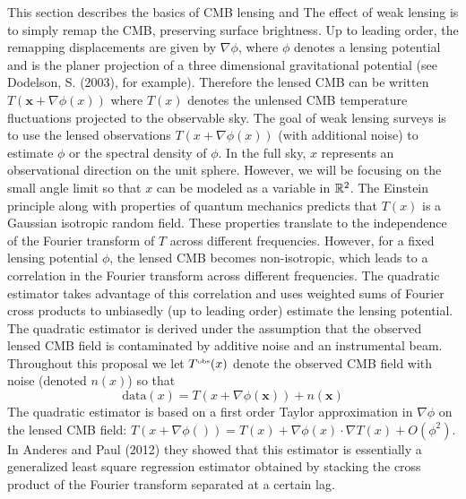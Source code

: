 \documentclass[noinfoline]{imsart}
\newcommand{\bx}{\boldsymbol x}
\begin{document}
This section describes the  basics of CMB lensing and The effect of weak lensing is to simply remap the CMB, preserving surface brightness.   Up to leading order, the remapping  displacements are given by $\nabla \phi$, where $\phi$ denotes a lensing potential and is the planer projection of a three dimensional gravitational potential (see Dodelson, S. (2003), for example). Therefore the lensed CMB can  be written $T(\bx + \nabla \phi(x))$ where $T(x)$ denotes the unlensed CMB temperature fluctuations projected to the observable sky.
The goal of weak lensing surveys is to use the lensed observations $T(x + \nabla \phi(x))$  (with additional noise) to  estimate $\phi$ or the spectral density of $\phi$.  In the full sky, $x$ represents an observational direction on the unit sphere. However, we will be focusing on the small angle limit  so that $x$ can be modeled as a variable in $ \Bbb R^2$.  The Einstein principle along with properties of quantum mechanics predicts that $T(x)$   is a Gaussian  isotropic random field. These properties translate to  the independence of the Fourier transform of $T$ across different frequencies.
 However, for a fixed lensing potential $\phi$, the lensed CMB  becomes non-isotropic, which leads to a correlation in the Fourier transform across different frequencies. The quadratic estimator   takes advantage of this correlation and uses weighted sums of Fourier  cross products to unbiasedly (up to leading order) estimate the lensing potential.
The quadratic estimator is derived under the assumption that the observed lensed CMB field is contaminated by additive noise and an instrumental beam. Throughout this proposal we let  $T^\text{\tiny obs}(x)$ denote the observed CMB field  with  noise (denoted $n(x)$) so that  
\[ \text{data}(x)= T(x + \nabla \phi(\bx))+ n(\bx)
 \]
The quadratic estimator is based on a first order Taylor approximation in $\nabla \phi $ on the lensed CMB field:
$T(x+\nabla \phi())= T(x) + \nabla \phi(x)\cdot \nabla T(x)+ O(\phi^2)$. 
In Anderes and Paul (2012) they showed that this estimator is essentially  a generalized least square regression estimator obtained by stacking the cross product of the Fourier transform separated at a certain lag.
\end{document}
